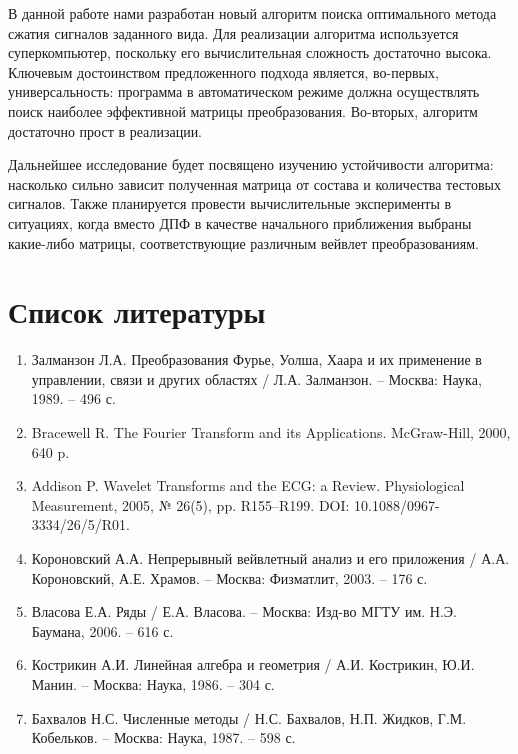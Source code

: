 \documentclass[11pt, oneside, a4paper]{article}
\begin{document}
В данной работе нами разработан новый алгоритм поиска оптимального метода сжатия сигналов заданного вида. Для реализации алгоритма используется суперкомпьютер, поскольку его вычислительная сложность достаточно высока. Ключевым достоинством предложенного подхода является, во-первых, универсальность: программа в автоматическом режиме должна осуществлять поиск наиболее эффективной матрицы преобразования. Во-вторых, алгоритм достаточно прост в реализации.

Дальнейшее исследование будет посвящено изучению устойчивости алгоритма: насколько сильно зависит полученная матрица от состава и количества тестовых сигналов. Также планируется провести вычислительные эксперименты в ситуациях, когда вместо ДПФ в качестве начального приближения выбраны какие-либо матрицы, соответствующие различным вейвлет преобразованиям.


\section{Список литературы}

\begin{enumerate} 
\item Залманзон Л.А. Преобразования Фурье, Уолша, Хаара и их применение в управлении, связи и других областях / Л.А. Залманзон. – Москва: Наука, 1989. – 496 с.
\item Bracewell R. The Fourier Transform and its Applications. McGraw-Hill, 2000, 640 p.
\item Addison P. Wavelet Transforms and the ECG: a Review. Physiological Measurement, 2005, № 26(5), pp. R155–R199. DOI: 10.1088/0967-3334/26/5/R01.
\item Короновский А.А. Непрерывный вейвлетный анализ и его приложения / А.А. Короновский, А.Е. Храмов. – Москва: Физматлит, 2003. – 176 с.
\item Власова Е.А. Ряды / Е.А. Власова. – Москва: Изд-во МГТУ им. Н.Э. Баумана, 2006. – 616 с.
\item Кострикин А.И. Линейная алгебра и геометрия / А.И. Кострикин, Ю.И. Манин. – Москва: Наука, 1986. – 304 с.
\item Бахвалов Н.С. Численные методы / Н.С. Бахвалов, Н.П. Жидков, Г.М. Кобельков. – Москва: Наука, 1987. – 598 с.
\end{enumerate}
\end{document}
